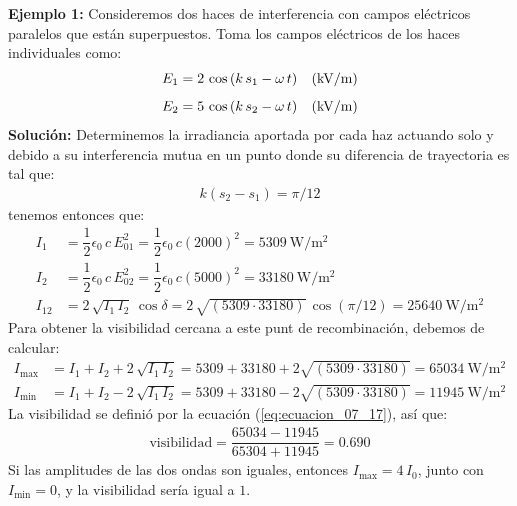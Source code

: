 \documentclass[14pt]{extarticle}
\begin{document}
\vspace{0.5cm}
\noindent
\textbf{Ejemplo 1:} Consideremos dos haces de interferencia con campos eléctricos paralelos que están superpuestos. Toma los campos eléctricos de los haces individuales como:
\begin{align*}
E_{1} &= 2 \, \cos \left( k \, s_{1} - \omega \, t \right) \hspace{0.3cm} (\unit{\kilo\volt\per\metre}) \\[0.5em]
E_{2} &= 5 \, \cos \left( k \, s_{2} - \omega \, t \right) \hspace{0.3cm} (\unit{\kilo\volt\per\metre})
\end{align*}
\noindent
\textbf{Solución:}
Determinemos la irradiancia aportada por cada haz actuando solo y debido a su interferencia mutua en un punto donde su diferencia de trayectoria es tal que:
\begin{align*}
k \left( s_{2} - s_{1} \right) = \pi / 12
\end{align*}
tenemos entonces que:
\begin{align*}
I_{1} &= \dfrac{1}{2} \epsilon_{0} \, c \, E_{01}^{2} = \dfrac{1}{2} \epsilon_{0} \, c \left( 2000 \right)^{2} = \SI{5309}{\watt\per\square\meter} \\[0.5em]
I_{2} &= \dfrac{1}{2} \epsilon_{0} \, c \, E_{02}^{2} = \dfrac{1}{2} \epsilon_{0} \, c \left( 5000 \right)^{2} = \SI{33180}{\watt\per\square\meter} \\[0.5em]
I_{12} &= 2 \, \sqrt{I_{1} \, I_{2}} \, \cos \delta = 2 \, \sqrt{(5309 \cdot 33180)} \, \cos (\pi/12) = \SI{25640}{\watt\per\square\meter}
\end{align*}
Para obtener la visibilidad cercana a este punt de recombinación, debemos de calcular:
\begin{align*}
I_{\max} &= I_{1} + I_{2} + 2 \, \sqrt{I_{1} \, I_{2}} = 5309 + 33180 + 2 \sqrt{(5309 \cdot 33180)} =  \SI{65034}{\watt\per\square\meter} \\[0.5em]
I_{\min} &= I_{1} + I_{2} - 2 \, \sqrt{I_{1} \, I_{2}} = 5309 + 33180 - 2 \sqrt{(5309 \cdot 33180)} =  \SI{11945}{\watt\per\square\meter}
\end{align*}
La visibilidad se definió por la ecuación (\ref{eq:ecuacion_07_17}), así que:
\begin{align*}
\text{visibilidad} = \dfrac{65034 - 11945}{65304 + 11945} = 0.690
\end{align*}
Si las amplitudes de las dos ondas son iguales, entonces $I_{\max} = 4 \, I_{0}$, junto con $I_{\min} = 0$, y la visibilidad sería igual a $1$.
\end{document}

